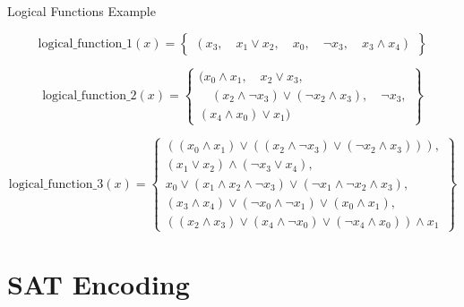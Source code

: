 \documentclass[12pt]{beamer}
\begin{document}
\begin{frame}{Logical Functions Example}
\vspace{-0.9cm}

\[
\text{logical\_function\_1}(x) =
\left\{
\begin{array}{c}
    (x_3, \quad x_1 \lor x_2, \quad x_0, \quad \neg x_3, \quad x_3 \land x_4)
\end{array} 
\right\}
\]

\vspace{-0.7cm}

\[
\text{logical\_function\_2}(x) =
\left\{
\begin{array}{c}
    (x_0 \land x_1, \quad x_2 \lor x_3, \\
    \quad (x_2 \land \neg x_3) \lor (\neg x_2 \land x_3), \quad \neg x_3, \\
    (x_4 \land x_0) \lor x_1)
\end{array}
\right\}
\]

\[
\text{logical\_function\_3}(x) =
\left\{
\begin{array}{c}
    ((x_0 \land x_1) \lor ((x_2 \land \neg x_3) \lor (\neg x_2 \land x_3))), \\
    (x_1 \lor x_2) \land (\neg x_3 \lor x_4), \\
    x_0 \lor (x_1 \land x_2 \land \neg x_3) \lor (\neg x_1 \land \neg x_2 \land x_3), \\
    (x_3 \land x_4) \lor (\neg x_0 \land \neg x_1) \lor (x_0 \land x_1), \\
    ((x_2 \land x_3) \lor (x_4 \land \neg x_0) \lor (\neg x_4 \land x_0)) \land x_1
\end{array}
\right\}
\]
\end{frame}


\section{SAT Encoding}
\end{document}
